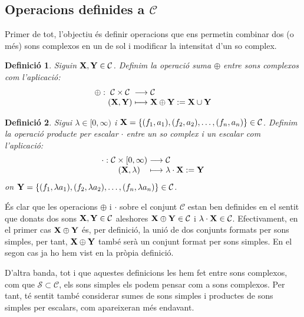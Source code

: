 \documentclass{article}
\theoremstyle{math}
\newtheorem{definition}{Definició}[section]
\theoremstyle{TheoremNum}
\newcommand{\0}{\ensuremath{\vb{0}}}
\newcommand{\X}{\ensuremath{\vb{X}}}
\newcommand{\Y}{\ensuremath{\vb{Y}}}
\begin{document}
\subsection{Operacions definides a \texorpdfstring{$\mathcal{C}$}{C}}
Primer de tot, l'objectiu és definir operacions que ens permetin combinar dos (o més) sons complexos en un de sol i modificar la intensitat d'un so complex.
\begin{definition}
    Siguin $\X,\Y\in\mathcal{C}$. Definim la operació \textit{suma $\oplus$} entre sons complexos com l'aplicació:
    \begin{equation*}
        \begin{array}{r@{\hspace{0.5\tabcolsep}}c@{\hspace{0.5\tabcolsep}}c@{\hspace{0.5\tabcolsep}}l}
            \oplus:&\mathcal{C}\times\mathcal{C}&\longrightarrow&\mathcal{C}\\
            &(\X,\Y)&\longmapsto&\X\oplus \Y:=\X\cup\Y
        \end{array}
    \end{equation*}
\end{definition}
\begin{definition}\label{prod_per_escalar}
    Sigui $\lambda\in[0,\infty)$ i $\X=\{(f_1,a_1),(f_2,a_2),\ldots,(f_n,a_n)\}\in\mathcal{C}$. Definim la operació \textit{producte per escalar $\cdot$} entre un so complex i un escalar com l'aplicació:
    \begin{equation*}
        \begin{array}{r@{\hspace{0.5\tabcolsep}}c@{\hspace{0.5\tabcolsep}}c@{\hspace{0.5\tabcolsep}}l}
            \cdot:&\mathcal{C}\times[0,\infty)&\longrightarrow&\mathcal{C}\\
            &(\X,\lambda)&\longmapsto&\lambda\cdot \X:=\Y
        \end{array}
    \end{equation*}
    on $\Y=\{(f_1,\lambda a_1),(f_2,\lambda a_2),\ldots,(f_n,\lambda a_n)\}\in\mathcal{C}$.
\end{definition}
És clar que les operacions $\oplus$ i $\cdot$ sobre el conjunt $\mathcal{C}$ estan ben definides en el sentit que donats dos sons $\X,\Y\in\mathcal{C}$ aleshores $\X\oplus\Y\in\mathcal{C}$ i $\lambda\cdot\X\in\mathcal{C}$. Efectivament, en el primer cas $\X\oplus\Y$ és, per definició, la unió de dos conjunts formats per sons simples, per tant, $\X\oplus\Y$ també serà un conjunt format per sons simples. En el segon cas ja ho hem vist en la pròpia definició.\par
D'altra banda, tot i que aquestes definicions les hem fet entre sons complexos, com que $\mathcal{S}\subset\mathcal{C}$, els sons simples els podem pensar com a sons complexos. Per tant, té sentit també considerar sumes de sons simples i productes de sons simples per escalars, com apareixeran més endavant.
\end{document}
